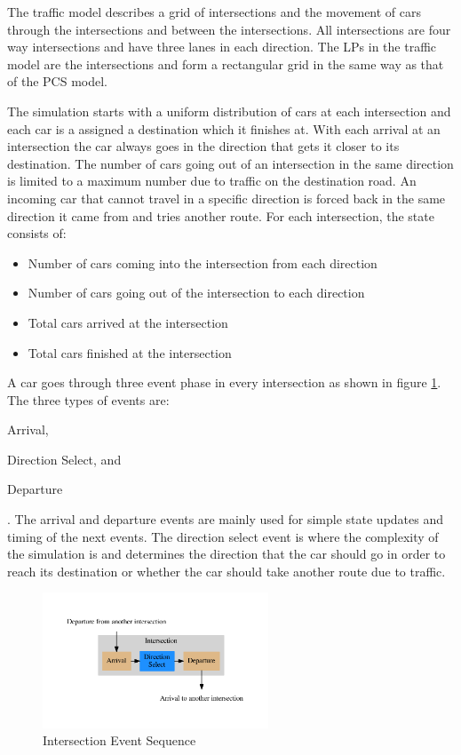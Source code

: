 \documentclass[11pt]{book}
\begin{document}
The traffic model describes a grid of intersections and the movement of cars through
the intersections and between the intersections. All intersections are four way intersections
and have three lanes in each direction. The LPs in the traffic model are the intersections
and form a rectangular grid in the same way as that of the PCS model.

The simulation starts with a uniform distribution of cars at each intersection and each
car is a assigned a destination which it finishes at. With each arrival at an intersection
the car always goes in the direction that gets it closer to its destination.
The number of cars going out of an intersection in the same direction is limited to a
maximum number due to traffic on the destination road. An incoming car that cannot travel in
a specific direction is forced back in the same direction it came from and tries another
route. For each intersection, the state consists of:

\begin{itemize}
    \item Number of cars coming into the intersection from each direction
    \item Number of cars going out of the intersection to each direction
    \item Total cars arrived at the intersection
    \item Total cars finished at the intersection
\end{itemize}

A car goes through three event phase in every intersection as shown in figure
\ref{traffic_events}. The three types of events are: \begin{inparaenum}[(1)] \item Arrival,
\item Direction Select, and \item Departure \end{inparaenum}. The arrival and departure
events are mainly used for simple state updates and timing of the next events.
The direction select event is where the complexity of the simulation is and determines the
direction that the car should go in order to reach its destination or whether the car should
take another route due to traffic.

\begin{figure}
    \centering
    \includegraphics[width=0.6\textwidth,quiet]{figs/graphviz/traffic_events.pdf}
    \caption{Intersection Event Sequence}\label{traffic_events}
\end{figure}
\end{document}
